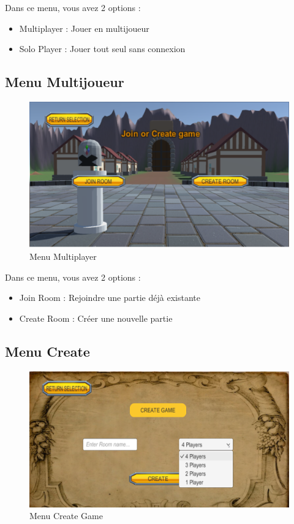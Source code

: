 \documentclass[a4paper, 11pt]{article}
\begin{document}
	\noindent Dans ce menu, vous avez 2 options :	
	
	\begin{itemize}
		\item Multiplayer : Jouer en multijoueur
		\item Solo Player : Jouer tout seul sans connexion
	\end{itemize}
	
	
	\subsection{Menu Multijoueur}
	\begin{figure}[!ht]
		\centering
		\includegraphics[scale=0.3]{images/multiplayer.png}
		\caption{Menu Multiplayer}
	\end{figure}
	
	\noindent Dans ce menu, vous avez 2 options :
	\begin{itemize}
		\item Join Room : Rejoindre une partie déjà existante
		\item Create Room : Créer une nouvelle partie
	\end{itemize}
	
	\clearpage	
	
	\subsection{Menu Create}
	\begin{figure}[!ht]
		\centering
		\includegraphics[scale=0.3]{images/create.png}
		\caption{Menu Create Game}
	\end{figure}
	
\end{document}
